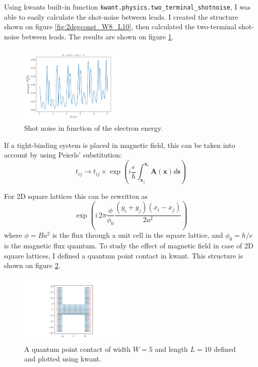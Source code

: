 \documentclass[11pt, a4paper, twocolumn]{article}
\begin{document}
Using kwants built-in function \texttt{kwant.physics.two\_terminal\_shotnoise},
I was able to easily calculate the shot-noise \cite{shotnoise} between leads. 
I created the structure shown on figure \ref{fig:2degconst_W8_L10}, then calculated
the two-terminal shot-noise between leads. The results are shown on figure \ref{fig:2deg_shotnoise_W40_L20_VL6_0_VS6_0}.
\begin{figure}[H]
  \begin{center}
  \includegraphics[width=0.45\textwidth]{./media/2deg_shotnoise_W40_L20_VL6_0_VS6_0.png}
  \caption{Shot noise in function of the electron energy.}
  \label{fig:2deg_shotnoise_W40_L20_VL6_0_VS6_0}
  \end{center}
\end{figure}
If a tight-binding system is placed in magnetic field, this can be taken into account by using Peierls' substitution:
\begin{equation*}
  t_{ij} \rightarrow t_{ij} \times \exp\left(i \frac{e}{\hbar} \int_{\mathbf{x}_j}^{\mathbf{x}_i} \mathbf{A}(\mathbf{x}) d\mathbf{s}\right)
\end{equation*}

For 2D square lattices this can be rewritten as 
\begin{equation*}
  \exp\left(i\, 2 \pi \frac{\phi}{\phi_0} \frac{(y_i + y_j)(x_i-x_j)}{2a^2} \right)  
\end{equation*}
where $\phi = B a^2$ is the flux through a unit cell in the square lattice,
and $\phi_0 = h/e$ is the magnetic flux quantum. To study the effect of magnetic field in case of 
2D square lattices, I defined a quantum point contact in kwant. This structure is shown on figure
\ref{fig:qpc_L10_W5}.

\begin{figure}[H]
  \begin{center}
  \includegraphics[width=0.45\textwidth]{./media/qpc_L10_W5.png}
  \caption{A quantum point contact of width $W=5$ and length $L=10$ defined and plotted using kwant.}
  \label{fig:qpc_L10_W5}
  \end{center}
\end{figure}
\end{document}
